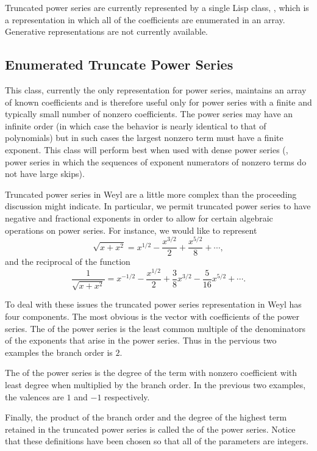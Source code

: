   
Truncated power series are currently represented by a single Lisp
class, , which is a representation in
which all of the coefficients are enumerated in an array. Generative
representations are not currently available.
  
\subsection{Enumerated Truncate Power Series}
  
This class, currently the only representation for power series,
maintains an array of known coefficients and is therefore useful only
for power series with a finite and typically small number of nonzero
coefficients.  The power series may have an infinite order (in which
case the behavior is nearly identical to that of polynomials) but in
such cases the largest nonzero term must have a finite exponent. This
class will perform best when used with dense power series (\ie, power
series in which the sequences of exponent numerators of nonzero terms
do not have large skips).
  
Truncated power series in Weyl are a little more complex than the
proceeding discussion might indicate.  In particular, we permit
truncated power series to have negative and fractional exponents in
order to allow for certain algebraic operations on power series. For
instance, we would like to represent
\[
\sqrt{x+x^2} = x^{1/2} - \frac{x^{3/2}}{2} + \frac{x^{5/2}}{8} +
\cdots,
\]
and the reciprocal of the function 
\[
\frac{1}{\sqrt{x+x^2}} = x^{-1/2} - \frac{x^{1/2}}{2} + \frac{3}{8}
x^{3/2}
- \frac{5}{16} x^{5/2} + \cdots.
\]

To deal with these issues the truncated power series representation in
Weyl has four components. The most obvious is the vector with
coefficients of the power series. The  of the power series
is the least common multiple of the denominators of the exponents that
arise in the power series. Thus in the pervious two examples the
branch order is $2$.
  
The  of the power series is the degree of the term with
nonzero coefficient with least degree when multiplied by the branch
order. In the previous two examples, the valences are $1$ and $-1$
respectively.

Finally, the product of the branch order and the degree of the highest
term retained in the truncated power series is called the 
of the power series.  Notice that these definitions have been chosen
so that all of the parameters are integers.
  
